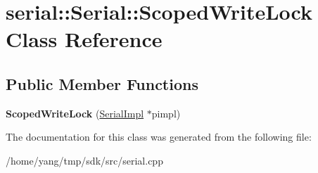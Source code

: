 \hypertarget{classserial_1_1_serial_1_1_scoped_write_lock}{}\section{serial\+:\+:Serial\+:\+:Scoped\+Write\+Lock Class Reference}
\label{classserial_1_1_serial_1_1_scoped_write_lock}
\subsection*{Public Member Functions}
\begin{DoxyCompactItemize}
\item 
{\bfseries Scoped\+Write\+Lock} (\hyperlink{classserial_1_1serial_1_1_serial_1_1_serial_impl}{Serial\+Impl} $\ast$pimpl)\hypertarget{classserial_1_1_serial_1_1_scoped_write_lock_a662173968431aee3d6f204c354b20225}{}\label{classserial_1_1_serial_1_1_scoped_write_lock_a662173968431aee3d6f204c354b20225}

\end{DoxyCompactItemize}


The documentation for this class was generated from the following file\+:\begin{DoxyCompactItemize}
\item 
/home/yang/tmp/sdk/src/serial.\+cpp\end{DoxyCompactItemize}

